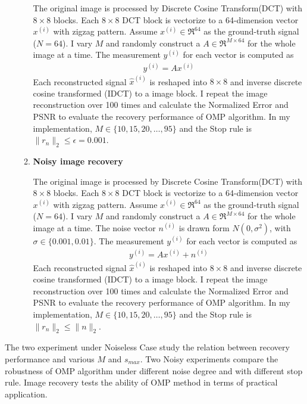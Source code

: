 \documentclass{ucsdreport}
\begin{document}
\begin{itemize}
\begin{enumerate}
        The original image is processed by Discrete Cosine Transform(DCT) with $8\times 8$ blocks. Each $8\times 8$ DCT block is vectorize to a 64-dimension vector $x^{(i)}$ with zigzag pattern. Assume $x^{(i)} \in \Re^{64}$ as the ground-truth signal ($N=64$). I vary $M$ and randomly construct a $A \in \Re^{M \times 64}$ for the whole image at a time. The measurement $y^{(i)}$ for each vector is computed as
        \begin{align*}
            y^{(i)} = Ax^{(i)}
        \end{align*}
        Each reconstructed signal $\hat{x}^{(i)}$ is reshaped into $8 \times 8$ and inverse discrete cosine transformed (IDCT) to a image block. I repeat the image reconstruction over 100 times and calculate the Normalized Error and PSNR to evaluate the recovery performance of OMP algorithm. In my implementation, $M \in \{10,15,20,\dots,95\}$ and the Stop rule is $\|r_n\|_2 \leq \epsilon=0.001$.
        
        \item \textbf{Noisy image recovery}
        
        The original image is processed by Discrete Cosine Transform(DCT) with $8\times 8$ blocks. Each $8\times 8$ DCT block is vectorize to a 64-dimension vector $x^{(i)}$ with zigzag pattern. Assume $x^{(i)} \in \Re^{64}$ as the ground-truth signal ($N=64$). I vary $M$ and randomly construct a $A \in \Re^{M \times 64}$ for the whole image at a time. The noise vector $n^{(i)}$ is drawn form $N(0,\sigma^2)$, with $\sigma \in \{0.001, 0.01\}$. The measurement $y^{(i)}$ for each vector is computed as
        \begin{align*}
            y^{(i)} = Ax^{(i)}+n^{(i)}
        \end{align*}
        Each reconstructed signal $\hat{x}^{(i)}$ is reshaped into $8 \times 8$ and inverse discrete cosine transformed (IDCT) to a image block. I repeat the image reconstruction over 100 times and calculate the Normalized Error and PSNR to evaluate the recovery performance of OMP algorithm. In my implementation, $M \in \{10,15,20,\dots,95\}$ and the Stop rule is $\|r_n\|_2 \leq \|n\|_2$.
    \end{enumerate}
\end{itemize}
The two experiment under Noiseless Case study the relation between recovery performance and various $M$ and $s_{max}$. Two Noisy experiments compare the robustness of OMP algorithm under different noise degree and with different stop rule. Image recovery tests the ability of OMP method in terms of practical application.
\end{document}
